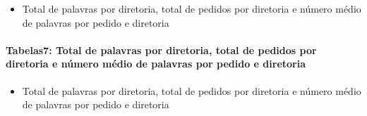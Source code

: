 \documentclass[]{article}
\newenvironment{Shaded}{\begin{snugshade}}{\end{snugshade}}
\newcommand{\DataTypeTok}[1]{\textcolor[rgb]{0.13,0.29,0.53}{#1}}
\newcommand{\KeywordTok}[1]{\textcolor[rgb]{0.13,0.29,0.53}{\textbf{#1}}}
\newcommand{\NormalTok}[1]{#1}
\newcommand{\OperatorTok}[1]{\textcolor[rgb]{0.81,0.36,0.00}{\textbf{#1}}}
\newcommand{\StringTok}[1]{\textcolor[rgb]{0.31,0.60,0.02}{#1}}
\providecommand{\tightlist}{%
  \setlength{\itemsep}{0pt}\setlength{\parskip}{0pt}}
\let\oldparagraph\paragraph
\renewcommand{\paragraph}[1]{\oldparagraph{#1}\mbox{}}
\begin{document}
\begin{itemize}
\tightlist
\item
  Total de palavras por diretoria, total de pedidos por diretoria e
  número médio de palavras por pedido e diretoria
\end{itemize}

\begin{Shaded}
\end{Shaded}

\hypertarget{tabelas7-total-de-palavras-por-diretoria-total-de-pedidos-por-diretoria-e-numero-medio-de-palavras-por-pedido-e-diretoria}{%
\paragraph{Tabelas7: Total de palavras por diretoria, total de pedidos
por diretoria e número médio de palavras por pedido e
diretoria}\label{tabelas7-total-de-palavras-por-diretoria-total-de-pedidos-por-diretoria-e-numero-medio-de-palavras-por-pedido-e-diretoria}}

\begin{itemize}
\tightlist
\item
  Total de palavras por diretoria, total de pedidos por diretoria e
  número médio de palavras por pedido e diretoria
\end{itemize}
\end{document}
